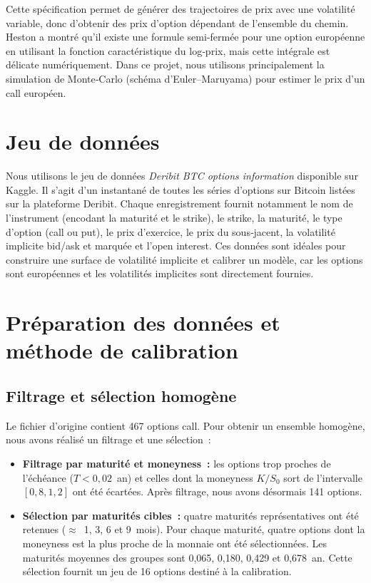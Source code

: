 \documentclass[12pt,a4paper]{article}
\begin{document}
Cette spécification permet de générer des trajectoires de prix avec une volatilité variable, donc d'obtenir des prix d'option dépendant de l'ensemble du chemin.  Heston a montré qu'il existe une formule semi‑fermée pour une option européenne en utilisant la fonction caractéristique du log‑prix, mais cette intégrale est délicate numériquement.  Dans ce projet, nous utilisons principalement la simulation de Monte‑Carlo (schéma d'Euler--Maruyama) pour estimer le prix d'un call européen.

\section{Jeu de données}

Nous utilisons le jeu de données \textit{Deribit BTC options information} disponible sur Kaggle.  Il s'agit d'un instantané de toutes les séries d'options sur Bitcoin listées sur la plateforme Deribit.  Chaque enregistrement fournit notamment le nom de l'instrument (encodant la maturité et le strike), le strike, la maturité, le type d'option (call ou put), le prix d'exercice, le prix du sous‑jacent, la volatilité implicite bid/ask et marquée et l'open interest\cite{deribit_dataset}.  Ces données sont idéales pour construire une surface de volatilité implicite et calibrer un modèle, car les options sont européennes et les volatilités implicites sont directement fournies.

\section{Préparation des données et méthode de calibration}

\subsection{Filtrage et sélection homogène}

Le fichier d'origine contient 467 options call.  Pour obtenir un ensemble homogène, nous avons réalisé un filtrage et une sélection :
\begin{itemize}
  \item \textbf{Filtrage par maturité et moneyness :} les options trop proches de l'échéance ($T<0{,}02$ an) et celles dont la moneyness $K/S_0$ sort de l'intervalle $[0{,}8,1{,}2]$ ont été écartées.  Après filtrage, nous avons désormais 141 options.
  \item \textbf{Sélection par maturités cibles :} quatre maturités représentatives ont été retenues ($\approx$ 1, 3, 6 et 9 mois).  Pour chaque maturité, quatre options dont la moneyness est la plus proche de la monnaie ont été sélectionnées.  Les maturités moyennes des groupes sont 0,065, 0,180, 0,429 et 0,678 an.  Cette sélection fournit un jeu de 16 options destiné à la calibration.
\end{itemize}
\end{document}
